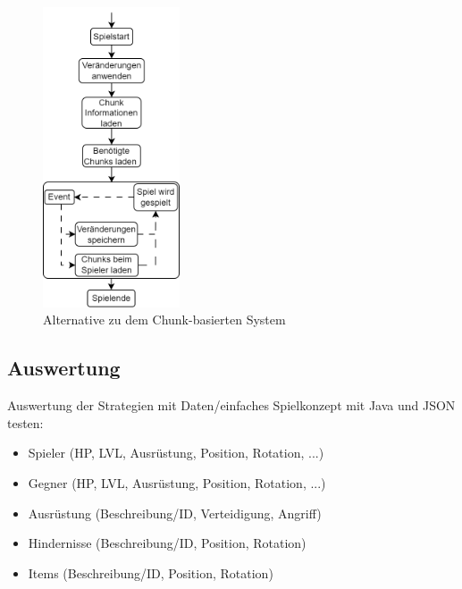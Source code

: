 \begin{figure}[htp]
    \centering
    \includegraphics[width=0.36\textwidth]{images/Chunkbasiert2.png}
    \caption{Alternative zu dem Chunk-basierten System}
    \label{fig:altchunkBasedSystem}
\end{figure}


\subsection{Auswertung}
Auswertung der Strategien mit Daten/einfaches Spielkonzept mit Java und JSON testen:
\begin{itemize}
    \item Spieler (HP, LVL, Ausrüstung, Position, Rotation, ...)
    \item Gegner (HP, LVL, Ausrüstung, Position, Rotation, ...)
    \item Ausrüstung (Beschreibung/ID, Verteidigung, Angriff)
    \item Hindernisse (Beschreibung/ID, Position, Rotation)
    \item Items (Beschreibung/ID, Position, Rotation)
\end{itemize}

